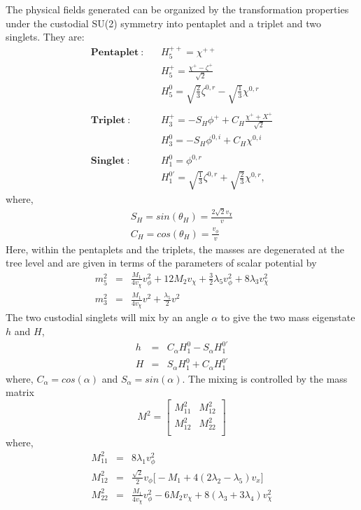 The physical fields generated can be organized by the transformation properties under the custodial SU(2) symmetry into pentaplet and a triplet and two singlets. They are:
\begin{eqnarray}
    \mathbf{Pentaplet}~:&   & H^{++}_5 = \chi^{++} \\
                        &   & H^+_5 = \frac{\chi^+ - \zeta^+}{\sqrt{2}} \\
                        &   & H^0_5 = \sqrt{\frac{2}{3}}\zeta^{0,r} - \sqrt{\frac{1}{3}}\chi^{0,r} \\
                        &   & \\
    \mathbf{Triplet}~:  &   & H^+_3 = -S_H \phi^+ + C_H \frac{\chi^++X^+}{\sqrt{2}} \\
                        &   & H^0_3 = -S_H \phi^{0,i} + C_H \chi^{0,i} \\
                        &   & \\
    \mathbf{Singlet}~:  &   & H^0_1 = \phi^{0,r}\\
                        &   & H^{0'}_1 = \sqrt{\frac{1}{3}}\zeta^{0,r} + \sqrt{\frac{2}{3}} \chi^{0,r},
\end{eqnarray}
where,
\begin{eqnarray}
    S_H = sin(\theta_H) = \frac{2\sqrt{2} v_\chi}{v} \\
    C_H = cos(\theta_H) = \frac{v_\phi}{v}
\end{eqnarray}
Here, within the pentaplets and the triplets, the masses are degenerated at the tree level and are given in terms of the parameters of scalar potential by
\begin{eqnarray}
    m_5^2 & = & \frac{M_1}{4v_\chi} v_{\phi}^2 + 12 M_2 v_{\chi} + \frac{3}{2}\lambda_5 v^2_{\phi} + 8 \lambda_3 v_{\chi}^2 \\
    m_3^2 & = & \frac{M_1}{4v_\chi} v^2 + \frac{\lambda_5}{2} v^2 
\end{eqnarray}
The two custodial singlets will  mix by an angle $\alpha$ to give the two mass eigenstate $h$ and $H$,
\begin{eqnarray}
    h & = & C_{\alpha} H^0_1 - S_{\alpha} H^{0'}_1 \\
    H & = & S_{\alpha} H^0_1 + C_{\alpha} H^{0'}_1
\end{eqnarray}
where, $C_{\alpha} = cos(\alpha)$ and $S_{\alpha} = sin(\alpha)$. The mixing is controlled by the mass matrix
\begin{equation}
    M^2 = 
        \begin{bmatrix}
            M_{11}^2 & M^2_{12} \\
            M_{12}^2 & M^2_{22} \\
        \end{bmatrix}
\end{equation}
where,
\begin{eqnarray}
    M^2_{11} & = & 8 \lambda_1 v^2_{\phi} \\
    M^2_{12} & = & \frac{\sqrt{2}}{2} v_{\phi} \Big[-M_1 + 4(2\lambda_2 - \lambda_5) v_x \Big] \\
    M^2_{22} & = & \frac{M_1}{4 v_{\chi}}v^2_{\phi} - 6 M_2 v_{\chi} + 8(\lambda_3 + 3\lambda_4) v^2_{\chi}
\end{eqnarray}

